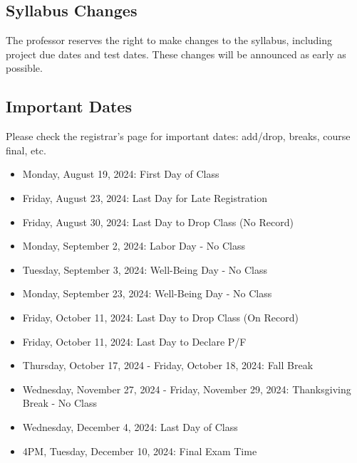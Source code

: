 \documentclass[11pt]{article}
\begin{document}
\subsection*{Syllabus Changes}
The professor reserves the right to make changes to the syllabus, including project due dates and test dates. These changes will be announced as early as possible.


\subsection*{Important Dates}   
Please check the registrar's page for important dates: add/drop, breaks, course final, etc.

\begin{itemize}
    \item Monday, August 19, 2024: First Day of Class
    \item Friday, August 23, 2024: Last Day for Late Registration
    \item Friday, August 30, 2024: Last Day to Drop Class (No Record)
    \item Monday, September 2, 2024: Labor Day - No Class
    \item Tuesday, September 3, 2024: Well-Being Day - No Class
    \item Monday, September 23, 2024: Well-Being Day - No Class
    \item Friday, October 11, 2024: Last Day to Drop Class (On Record)
    \item Friday, October 11, 2024: Last Day to Declare P/F
    \item Thursday, October 17, 2024 - Friday, October 18, 2024: Fall Break
    \item Wednesday, November 27, 2024 - Friday, November 29, 2024: Thanksgiving Break - No Class
    \item Wednesday, December 4, 2024: Last Day of Class
    \item 4PM, Tuesday, December 10, 2024: Final Exam Time
\end{itemize}

\end{document}
